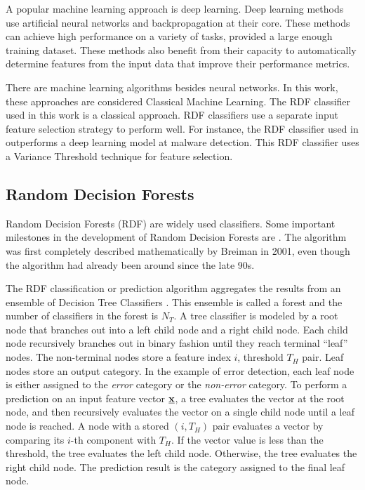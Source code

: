 A popular machine learning approach is deep learning. Deep learning methods use artificial neural networks and backpropagation at their core. These methods can achieve high performance on a variety of tasks, provided a large enough training dataset. These methods also benefit from their capacity to automatically determine features from the input data that improve their performance metrics.

There are machine learning algorithms besides neural networks. In this work, these approaches are considered Classical Machine Learning. The RDF classifier used in this work is a classical approach. RDF classifiers use a separate input feature selection strategy to perform well. For instance, the RDF classifier used in \cite{Sewak2018} outperforms a deep learning model at malware detection. This RDF classifier uses a Variance Threshold technique for feature selection.

\subsection{Random Decision Forests}
\label{sec:rdf_algorithm}

Random Decision Forests (RDF) are widely used classifiers. Some important milestones in the development of Random Decision Forests are \cite{Freund1996, Freund1996, Ho1998,Bauer1999, Breiman1999, Breiman2000, Breiman2001, Breiman1996, Pedregosa2011}. The algorithm was first completely described mathematically by Breiman in 2001, even though the algorithm had already been around since the late 90s.

The RDF classification or prediction algorithm aggregates the results from an ensemble of Decision Tree Classifiers \cite{Quinlan1986,Quinlan1987}. This ensemble is called a forest and the number of classifiers in the forest is $N_T$. A tree classifier is modeled by a root node that branches out into a left child node and a right child node. Each child node recursively branches out in binary fashion until they reach terminal ``leaf'' nodes. The non-terminal nodes store a feature index $i$, threshold $T_{H}$ pair. Leaf nodes store an output category. In the example of error detection, each leaf node is either assigned to the \emph{error} category or the \emph{non-error} category. To perform a prediction on an input feature vector $\underline{\mathbf{x}}$, a tree evaluates the vector at the root node, and then recursively evaluates the vector on a single child node until a leaf node is reached. A node with a stored $(i,T_H)$ pair evaluates a vector by comparing its $i$-th component with $T_H$. If the vector value is less than the threshold, the tree evaluates the left child node. Otherwise, the tree evaluates the right child node. The prediction result is the category assigned to the final leaf node.

